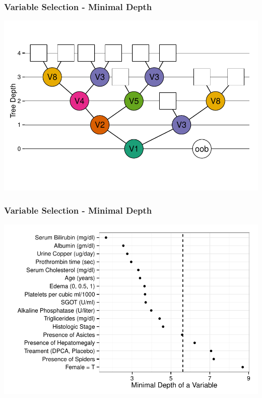 \documentclass[xcolor=svgnames]{beamer}\usepackage[]{graphicx}\usepackage[]{color}
\newenvironment{knitrout}{}{} %
\begin{document}
\begin{frame}
\frametitle{Variable Selection - Minimal Depth}
\begin{knitrout}\footnotesize
{}\color{fgcolor}

{\centering \includegraphics[width=.9\linewidth]{figures/treeDepth-1} 

}



\end{knitrout}
\end{frame}
%
%
\begin{frame}
\frametitle{Variable Selection - Minimal Depth}
\begin{knitrout}\footnotesize
{}\color{fgcolor}

{\centering \includegraphics[width=.9\linewidth]{figures/mindepth-pbc-1} 

}



\end{knitrout}
\end{frame}
\end{document}
